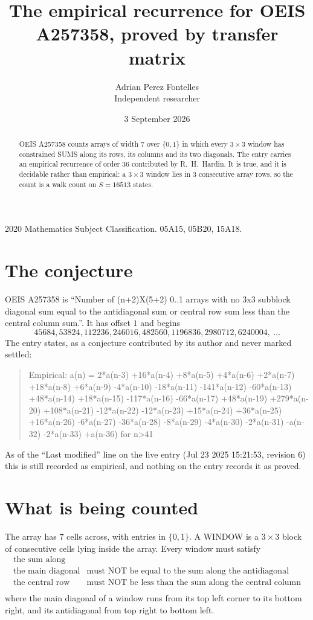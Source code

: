 \documentclass[11pt,a4paper]{article}
\title{The empirical recurrence for OEIS A257358, proved by transfer matrix}
\author{Adrian Perez Fontelles\\ \small Independent researcher}
\date{3 September 2026}
\theoremstyle{plain}
\theoremstyle{definition}
\begin{document}
\maketitle

\begin{abstract}
OEIS A257358 counts arrays of width $7$ over $\{0,1\}$ in which every $3\times3$ window has
constrained SUMS along its rows, its columns and its two diagonals. The entry carries an
empirical recurrence of order $36$ contributed by R.~H.~Hardin. It is true, and it is
decidable rather than empirical: a $3\times3$ window lies in $3$ consecutive array rows,
so the count is a walk count on $S=16513$ states.
\end{abstract}

\noindent\small 2020 Mathematics Subject Classification. 05A15, 05B20, 15A18.\normalsize

\section{The conjecture}

OEIS A257358 is ``Number of (n+2)X(5+2) 0..1 arrays with no 3x3 subblock diagonal sum equal to the antidiagonal sum or central row sum less than the central column sum.''. It has offset $1$ and begins
\[
45684, 53824, 112236, 246016, 482560, 1196836, 2980712, 6240004,\ \dots
\]
The entry states, as a conjecture contributed by its author and never marked settled:
\begin{quote}
Empirical: a(n) = 2*a(n-3) +16*a(n-4) +8*a(n-5) +4*a(n-6) +2*a(n-7) +18*a(n-8) +6*a(n-9) -4*a(n-10) -18*a(n-11) -141*a(n-12) -60*a(n-13) +48*a(n-14) +18*a(n-15) -117*a(n-16) -66*a(n-17) +48*a(n-19) +279*a(n-20) +108*a(n-21) -12*a(n-22) -12*a(n-23) +15*a(n-24) +36*a(n-25) +16*a(n-26) -6*a(n-27) -36*a(n-28) -8*a(n-29) -4*a(n-30) -2*a(n-31) -a(n-32) -2*a(n-33) +a(n-36) for n>41
\end{quote}
As of the ``Last modified'' line on the live entry (Jul 23 2025 15:21:53, revision 6) this is still
recorded as empirical, and nothing on the entry records it as proved.

\section{What is being counted}

The array has $7$ cells across, with entries in $\{0,1\}$. A WINDOW is a $3\times3$ block
of consecutive cells lying inside the array. Every window must satisfy
\[
\begin{array}{ll}
\text{the sum along} & \text{} \\[2pt]
\text{the main diagonal} & \text{must NOT be equal to the sum along the antidiagonal} \\
\text{the central row} & \text{must NOT be less than the sum along the central column} \\
\end{array}
\]
where the main diagonal of a window runs from its top left corner to its bottom right, and its
antidiagonal from top right to bottom left.
\end{document}
